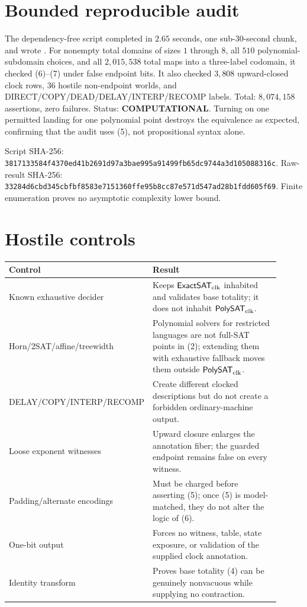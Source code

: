 \documentclass[11pt]{article}
\newcommand{\ExactSAT}{\mathsf{ExactSAT}_{\rm clk}}
\newcommand{\PolySAT}{\mathsf{PolySAT}_{\rm clk}}
\newcommand{\COMP}{\textbf{COMPUTATIONAL}}
\begin{document}
\section{Bounded reproducible audit}
The dependency-free script
 completed in
$2.65$ seconds, one sub-30-second chunk, and wrote
.
For nonempty total domains of sizes $1$ through $8$, all $510$ polynomial-
subdomain choices, and all $2{,}015{,}538$ total maps into a three-label
codomain, it checked (6)--(7) under false endpoint bits.  It also checked
$3{,}808$ upward-closed clock rows, $36$ hostile non-endpoint worlds, and
DIRECT/COPY/DEAD/DELAY/INTERP/RECOMP labels.  Total: $8{,}074{,}158$
assertions, zero failures.  Status: \COMP.  Turning on one permitted landing
for one polynomial point destroys the equivalence as expected, confirming
that the audit uses (5), not propositional syntax alone.

Script SHA-256:
\nolinkurl{3817133584f4370ed41b2691d97a3bae995a91499fb65dc9744a3d105088316c}.
Raw-result SHA-256:
\nolinkurl{33284d6cbd345cbfbf8583e7151360ffe95b8cc87e571d547ad28b1fdd605f69}.
Finite enumeration proves no asymptotic complexity lower bound.

\section{Hostile controls}
\begin{longtable}{p{0.24\linewidth}p{0.67\linewidth}}
\toprule Control & Result\\ \midrule
Known exhaustive decider & Keeps $\ExactSAT$ inhabited and validates base
totality; it does not inhabit $\PolySAT$.\\
Horn/2SAT/affine/treewidth & Polynomial solvers for restricted languages are
not full-SAT points in (2); extending them with exhaustive fallback moves
them outside $\PolySAT$.\\
DELAY/COPY/INTERP/RECOMP & Create different clocked descriptions but do not
create a forbidden ordinary-machine output.\\
Loose exponent witnesses & Upward closure enlarges the annotation fiber;
the guarded endpoint remains false on every witness.\\
Padding/alternate encodings & Must be charged before asserting (5); once (5)
is model-matched, they do not alter the logic of (6).\\
One-bit output & Forces no witness, table, state exposure, or validation of
the supplied clock annotation.\\
Identity transform & Proves base totality (4) can be genuinely nonvacuous
while supplying no contraction.\\
\bottomrule
\end{longtable}
\end{document}
